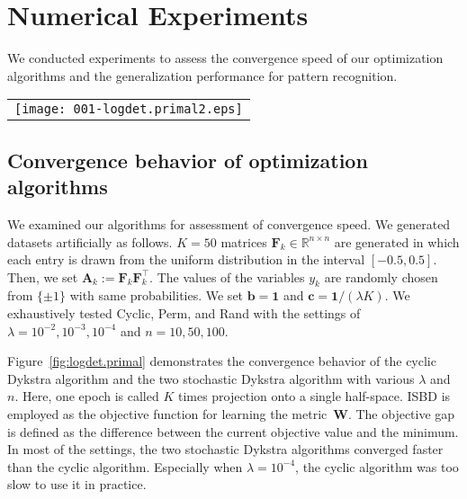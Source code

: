 \documentclass[10pt,onecolumn]{article}
\theoremstyle{definition}
\theoremstyle{definition}
\theoremstyle{definition}
\theoremstyle{definition}
\theoremstyle{definition}
\theoremstyle{theorem}
\newcommand{\0}{{\bm{0}}}
\newcommand{\1}{{\bm{1}}}
\newcommand{\vb}{{\bm{b}}}
\newcommand{\vc}{{\bm{c}}}
\newcommand{\vA}{{\bm{A}}}
\newcommand{\vF}{{\bm{F}}}
\newcommand{\bR}{{\mathbb{R}}}
\newcommand{\vW}{{\bm{W}}}
\begin{document}
\section{Numerical Experiments}

We conducted experiments to assess the convergence speed of
our optimization algorithms and the generalization
performance for pattern recognition.

\begin{figure*}[t!]
\begin{center}
\begin{tabular}{l}
\texttt{[image: 001-logdet.primal2.eps]}
\end{tabular}
\end{center}
\caption{Convergence behavior of the algorithms using different settings. \label{fig:logdet.primal}}
\end{figure*}

\subsection{Convergence behavior of optimization algorithms}
%
We examined our algorithms for assessment of convergence
speed. We generated datasets artificially as follows. $K=50$
matrices $\vF_{k}\in\bR^{n\times n}$ are generated in which
each entry is drawn from the uniform distribution in the
interval $[-0.5,0.5]$. Then, we set
$\vA_{k}:=\vF_{k}\vF_{k}^\top$. The values of the variables
$y_{k}$ are randomly chosen from $\{\pm 1\}$ with same
probabilities. We set $\vb=\1$ and $\vc=\1/(\lambda K)$. We
exhaustively tested Cyclic, Perm, and Rand with the settings
of $\lambda=10^{-2},10^{-3},10^{-4}$ and $n=10,50,100$.

Figure~\ref{fig:logdet.primal}
demonstrates the convergence behavior of the
cyclic Dykstra algorithm and the two stochastic Dykstra
algorithm with various $\lambda$ and $n$. Here, one epoch is
called $K$ times projection onto a single half-space.
ISBD is employed as the objective function for learning the metric~$\vW$.
The
objective gap is defined as the difference between the
current objective value and the minimum. In most of the
settings, the two stochastic Dykstra algorithms converged
faster than the cyclic algorithm. Especially when
$\lambda=10^{-4}$, the cyclic algorithm was too slow to use
it in practice.
\end{document}
